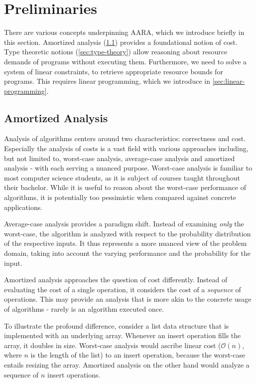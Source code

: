 \chapter{Preliminaries} \label{chap:preliminaries}

There are various concepts underpinning AARA, which we introduce briefly in this section. Amortized analysis (\cref{sec:amortized-analysis}) provides a foundational notion of cost. Type theoretic notions (\cref{sec:type-theory}) allow reasoning about resource demands of programs without executing them. Furthermore, we need to solve a system of linear constraints, to retrieve appropriate resource bounds for programs. This requires linear programming, which we introduce in \cref{sec:linear-programming}. 

\section{Amortized Analysis}\label{sec:amortized-analysis}

Analysis of algorithms centers around two characteristics: correctness and cost. Especially the analysis of costs is a vast field with various approaches including, but not limited to, worst-case analysis, average-case analysis and amortized analysis - with each serving a nuanced purpose. Worst-case analysis is familiar to most computer science students, as it is subject of courses taught throughout their bachelor. While it is useful to reason about the worst-case performance of algorithms, it is potentially too pessimistic when compared against concrete applications. 

Average-case analysis provides a paradigm shift. Instead of examining \emph{only} the worst-case, the algorithm is analyzed with respect to the probability distribution of the respective inputs. It thus represents a more nuanced view of the problem domain, taking into account the varying performance and the probability for the input. 

Amortized analysis approaches the question of cost differently. Instead of evaluating the cost of a single operation, it considers the cost of a \emph{sequence} of operations. This may provide an analysis that is more akin to the concrete usage of algorithms - rarely is an algorithm executed once.

To illustrate the profound difference, consider a list data structure that is implemented with an underlying array. Whenever an insert operation fills the array, it doubles in size. Worst-case analysis would ascribe linear cost (\(\mathcal{O}(n)\), where \(n\) is the length of the list) to an insert operation, because the worst-case entails resizing the array. Amortized analysis on the other hand would analyze a sequence of \(n\) insert operations.

